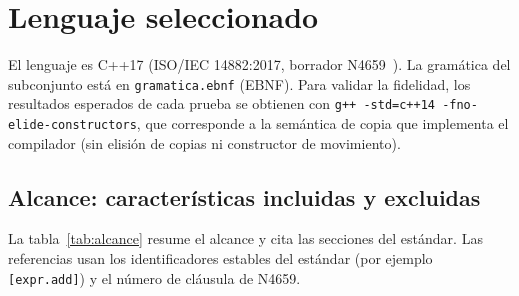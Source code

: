 \documentclass[11pt,a4paper]{article}
\newcommand{\cod}[1]{\texttt{#1}}
\begin{document}
\section{Lenguaje seleccionado}
\label{sec:lenguaje}
El lenguaje es C++17 (ISO/IEC 14882:2017, borrador N4659~\cite{cpp17}). La gramática del subconjunto está en
\cod{gramatica.ebnf} (EBNF). Para validar la fidelidad, los resultados esperados de cada prueba se obtienen con
\cod{g++ -std=c++14 -fno-elide-constructors}, que corresponde a la semántica de copia que implementa el compilador
(sin elisión de copias ni constructor de movimiento).

\subsection{Alcance: características incluidas y excluidas}
La tabla~\ref{tab:alcance} resume el alcance y cita las secciones del estándar. Las referencias usan los
identificadores estables del estándar (por ejemplo \cod{[expr.add]}) y el número de cláusula de N4659.
\end{document}
